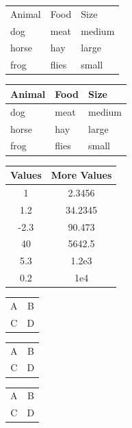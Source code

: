 \documentclass{article}
\begin{document}
\begin{tabular}{l|ll}
Animal & Food & Size \\[5pt]
dog & meat & medium \\
horse & hay & large \\
frog & flies & small \\
\end{tabular}

\begin{tabular}{@{} lll@{}} \toprule[2pt]
Animal & Food & Size \\ \midrule[1pt]
dog & meat & medium \\
\cmidrule[0.5pt](r{1pt}l{1cm}){1-2}
horse & hay & large \\
frog & flies & small \\ \bottomrule[2pt]
\end{tabular}

\begin{tabular}{SS}
\toprule
{Values} & {More Values} \\
 & 2.3456 \\
1.2 & 34.2345 \\
-2.3 & 90.473 \\
40 & 5642.5 \\
5.3 & 1.2e3 \\
0.2 & 1e4 \\
\bottomrule
\end{tabular}

\begin{center}
\begin{tabular}{cc}
\hline
A & B\\
C & D\\
\hline
\end{tabular}
\end{center}

\begin{center}
\begin{tabular*}{.5\textwidth}{@{\extracolsep{\fill}}cc@{}}
\hline
A & B\\
C & D\\
\hline
\end{tabular*}
\end{center}

\begin{center}
\begin{tabular*}{\textwidth}{@{\extracolsep{\fill}}cc@{}}
\hline
A & B\\
C & D\\
\hline
\end{tabular*}
\end{center}
\end{document}
